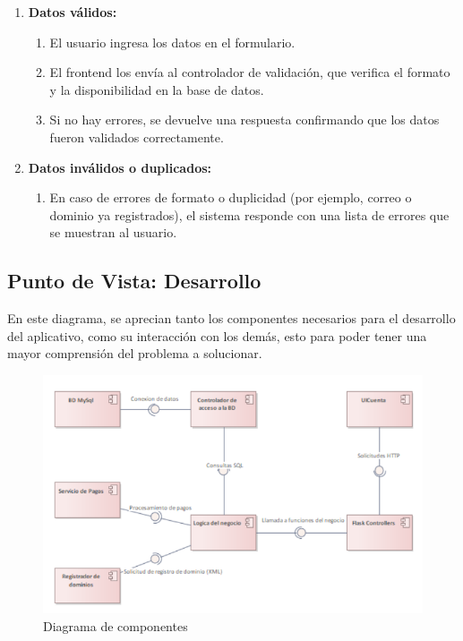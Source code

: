 \begin{enumerate}
    \item \textbf{Datos válidos:}
    \begin{enumerate}
        \item El usuario ingresa los datos en el formulario.
        \item El frontend los envía al controlador de validación, que verifica el formato y la disponibilidad en la base de datos.
        \item Si no hay errores, se devuelve una respuesta confirmando que los datos fueron validados correctamente.
    \end{enumerate}

    \item \textbf{Datos inválidos o duplicados:}
    \begin{enumerate}
    	\item En caso de errores de formato o duplicidad (por ejemplo, correo o dominio ya registrados), el sistema responde con una lista de errores que se muestran al usuario.
    \end{enumerate}
\end{enumerate}

\subsection{Punto de Vista: Desarrollo}
En este diagrama, se aprecian tanto los componentes necesarios para el desarrollo del aplicativo, como su interacción con los demás, esto para poder tener una mayor comprensión del problema a solucionar.
\begin{figure}[H]
	\includegraphics[width=\columnwidth]{puntovista/diacomponentes.png}
	\caption{Diagrama de componentes}
	\label{fig:diacomponentes}
\end{figure}

